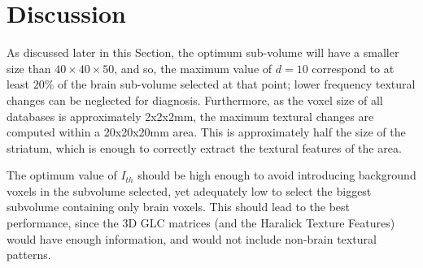 \section{Discussion}\label{sec:ch5discuss}



As discussed later in this Section, the optimum sub-volume will have a smaller size than $40\times40\times50$, and so, the maximum value of $d=10$ correspond to at least $20\%$ of the brain sub-volume selected at that point; lower frequency textural changes can be neglected for diagnosis. Furthermore, as the voxel size of all databases is approximately 2x2x2mm, the maximum textural changes are computed within a 20x20x20mm area. This is approximately half the size of the striatum, which is enough to correctly extract the textural features of the area. 


The optimum value of $I_{th}$ should be high enough to avoid introducing background voxels in the subvolume selected, yet adequately low to select the biggest subvolume containing only brain voxels. This should lead to the best performance, since the 3D GLC matrices (and the Haralick Texture Features) would have enough information, and would not include non-brain textural patterns. 
